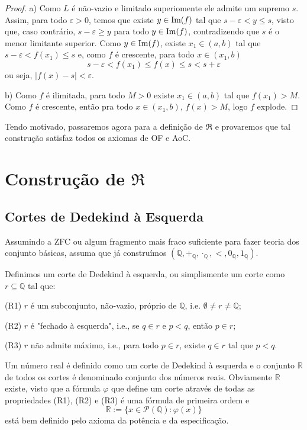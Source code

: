 \documentclass[11pt]{article}
\newcommand{\mc}[1]{\mathcal{#1}}
\newcommand{\mf}[1]{\mathfrak{#1}}
\newcommand{\mbb}[1]{\mathbb{#1}}
\newcommand{\im}[1]{\text{\normalfont Im}(#1)}
\newcommand{\cl}[1]{\colorlet{shadecolor}{#1}}
\begin{document}
\begin{proof}
    a) Como $L$ é não-vazio e limitado superiomente ele admite um supremo $s$. Assim, para todo $\varepsilon>0$, temos que existe $y\in\im{f}$ tal que $s-\varepsilon<y\leq s$, visto que, caso contrário, $s-\varepsilon\geq y$ para todo $y\in\im{f}$, contradizendo que $s$ é o menor limitante superior. Como $y\in\im{f}$, existe $x_1\in(a,b)$ tal que $s-\varepsilon<f(x_1)\leq s$ e, como $f$ é crescente, para todo $x\in(x_1,b)$
    $$s-\varepsilon<f(x_1)\leq f(x)\leq s<s+\varepsilon$$
    ou seja, $|f(x)-s|<\varepsilon$.

    b) Como $f$ é ilimitada, para todo $M>0$ existe $x_1\in(a,b)$ tal que $f(x_1)>M$. Como $f$ é crescente, então pra todo $x\in(x_1,b)$, $f(x)>M$, logo $f$ explode.
\end{proof}

Tendo motivado, passaremos agora para a definição de $\mf{R}$ e provaremos que tal construção satisfaz todos os axiomas de OF e AoC.

\section{Construção de $\mf{R}$}

\subsection{Cortes de Dedekind à Esquerda}

Assumindo a ZFC ou algum fragmento mais fraco suficiente para fazer teoria dos conjunto básicas, assuma que já construímos $(\mbb{Q},+_\mbb{Q},\cdot_\mbb{Q},<,0_\mbb{Q},1_\mbb{Q})$.

\cl{blue!15}
\begin{shaded}
    \begin{definition}
    Definimos um corte de Dedekind à esquerda, ou simplismente um corte como $r\subseteq\mbb{Q}$ tal que:

    (R1) $r$ é um subconjunto, não-vazio, próprio de $\mbb{Q}$, i.e. $\emptyset\neq r\neq\mbb{Q}$;

    (R2) $r$ é "fechado à esquerda", i.e., se $q\in r$ e $p< q$, então $p\in r$;

    (R3) $r$ não admite máximo, i.e., para todo $p\in r$, existe $q\in r$ tal que $p< q$.
\end{definition}
\end{shaded}

Um número real é definido como um corte de Dedekind à esquerda e o conjunto $\mbb{R}$ de todos os cortes é denominado conjunto dos números reais. Obviamente $\mbb{R}$ existe, visto que a fórmula $\varphi$ que define um corte através de todas as propriedades (R1), (R2) e (R3) é uma fórmula de primeira ordem e
$$\mbb{R}:=\{x\in\mc{P}(\mbb{Q}):\varphi(x)\}$$
está bem definido pelo axioma da potência e da especificação.
\end{document}
